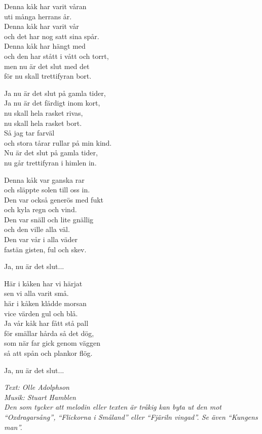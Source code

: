 \vspace{10pt}
Denna kåk har varit våran\\
uti många herrans år.\\
Denna kåk har varit vår\\
och det har nog satt sina spår.\\
Denna kåk har hängt med\\
och den har stått i vått och torrt,\\
men nu är det slut med det\\
för nu skall trettifyran bort.\par
\vspace{10pt}
Ja nu är det slut på gamla tider,\\
Ja nu är det färdigt inom kort,\\
nu skall hela rasket rivas,\\
nu skall hela rasket bort.\\
Så jag tar farväl\\
och stora tårar rullar på min kind.\\
Nu är det slut på gamla tider,\\
nu går trettifyran i himlen in.\par
\vspace{10pt}
Denna kåk var ganska rar\\
och släppte solen till oss in.\\
Den var också generös med fukt\\
och kyla  regn och vind.\\
Den var snäll och lite gnällig\\
och den ville alla väl.\\
Den var vår i alla väder\\
fastän gisten, ful och skev.\par
\vspace{10pt}
Ja, nu är det slut...\par
\vspace{10pt}
Här i kåken har vi härjat\\
sen vi alla varit små.\\
här i kåken klådde morsan\\
vice värden gul och blå.\\
Ja vår kåk har fått stå pall\\
för smällar hårda så det dög,\\
som när far gick genom väggen\\
så att spån och plankor flög.\par
\vspace{10pt}
Ja, nu är det slut...\par
\vspace{10pt}
{\footnotesize\textit{Text: Olle Adolphson\\ Musik: Stuart
Hamblen\\Den som tycker att melodin eller texten är tråkig kan byta ut
den mot ``Oxdragarsång'', ``Flickorna i Småland'' eller ``Fjäriln
vingad''. Se även ``Kungens man''.}}
